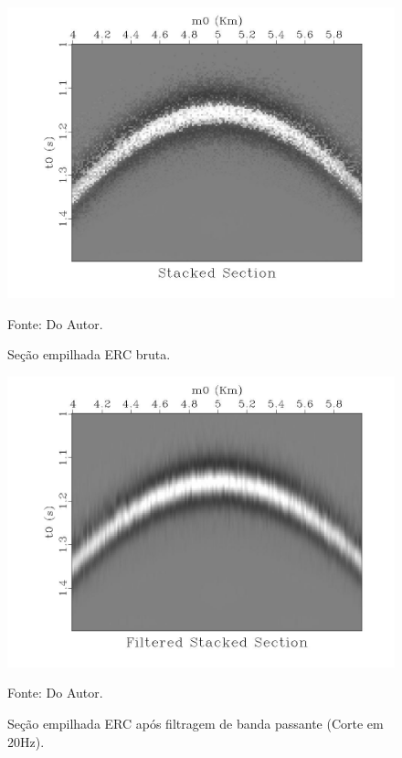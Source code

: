 \begin{figure}
\caption{Seção empilhada ERC bruta.}
\begin{center}
\includegraphics[scale=0.4]{images/stackedSection.jpeg}
\vspace{-0.3cm}
\end{center}
\begin{center}
 Fonte: Do Autor.
\end{center}
\label{fig:7.7}
\end{figure}

\begin{figure}
\caption{Seção empilhada ERC após filtragem de banda passante (Corte em 20Hz).}
\begin{center}
\includegraphics[scale=0.4]{images/filteredStackedSection.jpeg}
\vspace{-0.3cm}
\end{center}
\begin{center}
 Fonte: Do Autor.
\end{center}
\label{fig:7.8}
\end{figure}

